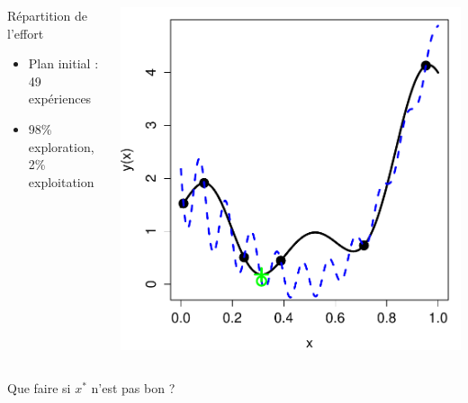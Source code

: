 \documentclass{beamer}
\begin{document}
\begin{frame}
\begin{columns}[c]
\begin{column}{.51\textwidth}
\begin{block}{Répartition de l'effort}
 \begin{itemize}
  \item Plan initial : 49 expériences
  \item 98\% exploration, 2\% exploitation
 \end{itemize}
\end{block}
 \end{column}
 \begin{column}{.49\textwidth}
  \includegraphics[width=\textwidth]{fig/exoptim1.pdf}
 \end{column}
\end{columns}
\vspace{1mm}
\centering
\alert{Que faire si $x^*$ n'est pas bon ?}
\end{frame}
\end{document}
